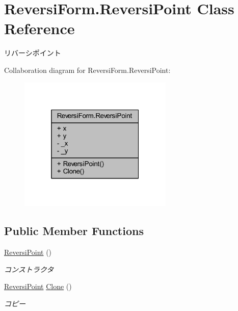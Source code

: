 \hypertarget{class_reversi_form_1_1_reversi_point}{}\section{Reversi\+Form.\+Reversi\+Point Class Reference}
\label{class_reversi_form_1_1_reversi_point}


リバーシポイント  




Collaboration diagram for Reversi\+Form.\+Reversi\+Point\+:\nopagebreak
\begin{figure}[H]
\begin{center}
\leavevmode
\includegraphics[width=208pt]{class_reversi_form_1_1_reversi_point__coll__graph}
\end{center}
\end{figure}
\subsection*{Public Member Functions}
\begin{DoxyCompactItemize}
\item 
\hyperlink{class_reversi_form_1_1_reversi_point_a19bc338ec65d6b967f741c1c73ad5b16}{Reversi\+Point} ()
\begin{DoxyCompactList}\small\item\em コンストラクタ \end{DoxyCompactList}\item 
\hyperlink{class_reversi_form_1_1_reversi_point}{Reversi\+Point} \hyperlink{class_reversi_form_1_1_reversi_point_a0a237cffa3c12ec78bdf19c3baecfa69}{Clone} ()
\begin{DoxyCompactList}\small\item\em コピー \end{DoxyCompactList}\end{DoxyCompactItemize}
